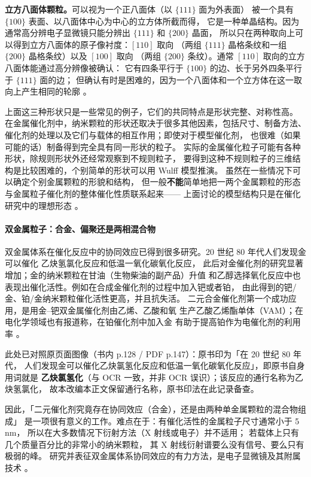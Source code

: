 \begin{principle}
\textbf{立方八面体颗粒。}可以视为一个正八面体（以 $\{111\}$ 面为外表面）
被一个具有 $\{100\}$ 表面、以八面体中心为中心的立方体所截而得，
它是一种单晶结构。因为通常高分辨电子显微镜只能分辨出 $\{111\}$ 和 $\{200\}$ 晶面，
所以只在两种取向上可以得到立方八面体的原子像衬度：$[110]$ 取向
（两组 $\{111\}$ 晶格条纹和一组 $\{200\}$ 晶格条纹）以及 $[100]$ 取向
（两组 $\{200\}$ 条纹）。通常 $[110]$ 取向的立方八面体能通过高分辨像被确认：
它有四条平行于 $\{100\}$ 的边、长于另外四条平行于 $\{111\}$ 面的边；
但确认有时是困难的，因为一个八面体和一个立方体在这一取向上产生相同的轮廓
。
\end{principle}

上面这三种形状只是一些常见的例子，它们的共同特点是形状完整、对称性高。
在金属催化剂中，纳米颗粒的形状还取决于很多其他因素，包括尺寸、制备方法、
催化剂的处理以及它们与载体的相互作用；即使对于模型催化剂，
也很难（如果可能的话）制备得到完全具有同一形状的粒子。
实际的金属催化粒子可能有各种形状，除规则形状外还经常观察到不规则粒子，
要得到这种不规则粒子的三维结构是比较困难的，个别简单的形状可以用 Wulff 模型推演。
虽然在一些情况下可以确定个别金属颗粒的形貌和结构，
但一般\textbf{不能}简单地把一两个金属颗粒的形态与金属粒子催化剂的整体催化性质联系起来——
上面讨论的模型结构只是在催化研究中的理想形态
。
\paragraph{双金属粒子：合金、偏聚还是两相混合物}
双金属体系在催化反应中的协同效应已得到很多研究。20 世纪 80 年代人们发现金可以催化
乙炔氢氯化反应和低温一氧化碳氧化反应，
此后对金催化剂的研究显著增加；金的纳米颗粒在甘油（生物柴油的副产品）升值
和乙醇选择氧化反应中也表现出催化活性。例如在合成金催化剂的过程中加入钯或者铂，
由此得到的钯/金、铂/金纳米颗粒催化活性更高，并且抗失活。
二元合金催化剂第一个成功应用，是用金--钯双金属催化剂由乙烯、乙酸和氧
生产乙酸乙烯酯单体（VAM）；在电化学领域也有报道称，在铂催化剂中加入金
有助于提高铂作为电催化剂的利用率
。

此处已对照原页面图像（书内 p.128 / PDF p.147）：原书印为「在 20 世纪 80 年代，
人们发现金可以催化乙炔氯氢化反应和低温一氧化碳氧化反应」，即原书自身用词就是
\textbf{乙炔氯氢化}（与 OCR 一致，并非 OCR 误识）；该反应的通行名称为乙炔氢氯化，
故本改编本正文保留通行名称，原书印法在此记录备查。

因此，「二元催化剂究竟存在协同效应（合金），还是由两种单金属颗粒的混合物组成」
是一项很有意义的工作。难点在于：有催化活性的金属粒子尺寸通常小于 5\,nm，
所以在大多数情况下衍射方法（X 射线或电子）并不适用；
若载体上只有几个质量百分比的非常小的纳米颗粒，
其 X 射线衍射谱要么没有信号、要么只有极弱的峰。
研究并表征双金属体系协同效应的有力方法，是电子显微镜及其附属技术
。

